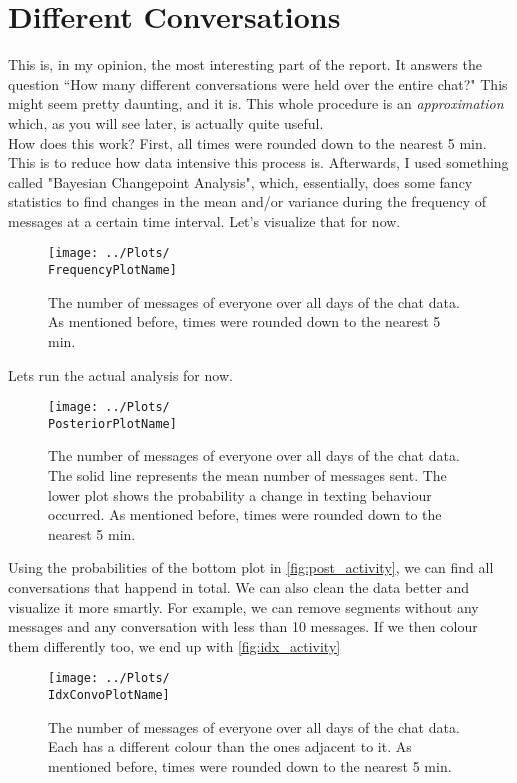 \documentclass{WAReport}
\begin{document}
\section{Different Conversations}
This is, in my opinion, the most interesting part of the report. It answers the question ``How many different conversations were held over the entire chat?"
This might seem pretty daunting, and it is. This whole procedure is an \emph{approximation} which, as you will see later, is actually quite useful. \\

How does this work? First, all times were rounded down to the nearest 5 min. This is to reduce how data intensive this process is. Afterwards, I used something called "Bayesian Changepoint Analysis", which, essentially, does some fancy statistics to find changes in the mean and/or variance during the frequency of messages at a certain time interval. Let's visualize that for now. 


\begin{figure}[h!]
    \texttt{[image: ../Plots/\\FrequencyPlotName]}
    \caption{The number of messages of everyone over all days of the chat data. As mentioned before, times were rounded down to the nearest 5 min.}
    \label{fig:freq_activity}
\end{figure}

Lets run the actual analysis for now.

\begin{figure}[h!]
    \texttt{[image: ../Plots/\\PosteriorPlotName]}
    \caption{The number of messages of everyone over all days of the chat data. The solid line represents the mean number of messages sent. The lower plot shows the probability a change in texting behaviour occurred. As mentioned before, times were rounded down to the nearest 5 min.}
    \label{fig:post_activity}
\end{figure}

Using the probabilities of the bottom plot in \autoref{fig:post_activity}, we can find all conversations that happend in total. We can also clean the data better and visualize it more smartly. For example, we can remove segments without any messages and any conversation with less than 10 messages. If we then colour them differently too, we end up with \autoref{fig:idx_activity}

\begin{figure}[h!]
    \texttt{[image: ../Plots/\\IdxConvoPlotName]}
    \caption{The number of messages of everyone over all days of the chat data. Each has a different colour than the ones adjacent to it. As mentioned before, times were rounded down to the nearest 5 min.}
    \label{fig:idx_activity}
\end{figure}
\end{document}
